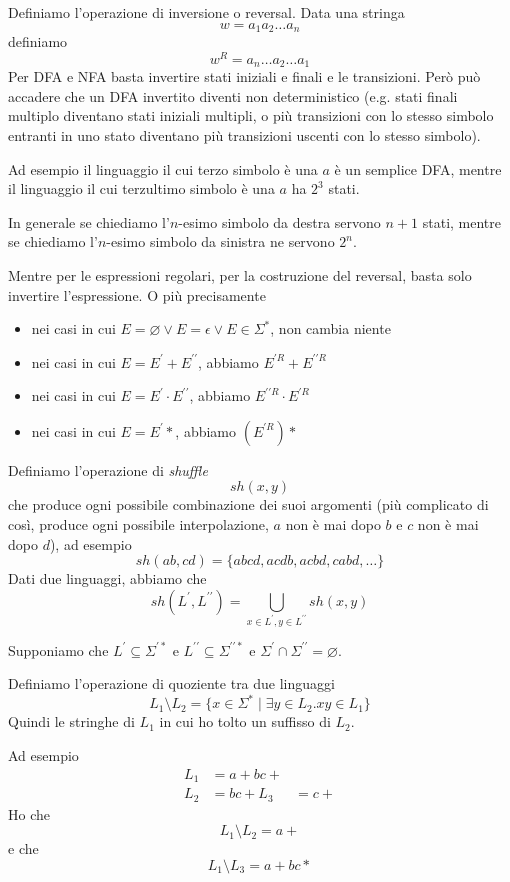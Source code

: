 \documentclass[12pt]{article}
\begin{document}
Definiamo l'operazione di inversione o reversal.
Data una stringa 
$$ w = a_1 a_2 \dots a_n $$
definiamo
$$ w^R = a_n \dots a_2 \dots a_1 $$
Per DFA e NFA basta invertire stati iniziali e finali e le transizioni.
Però può accadere che un DFA invertito diventi non deterministico (e.g. stati finali multiplo diventano stati iniziali multipli, o più transizioni con lo stesso simbolo entranti in uno stato diventano più transizioni uscenti con lo stesso simbolo).
\begin{tcolorbox}
	Ad esempio il linguaggio il cui terzo simbolo è una $a$ è un semplice DFA, mentre il linguaggio il cui terzultimo simbolo è una $a$ ha $2^3$ stati.

	In generale se chiediamo l'$n$-esimo simbolo da destra servono $n + 1$ stati, mentre se chiediamo l'$n$-esimo simbolo da sinistra ne servono $2^n$.
\end{tcolorbox}
Mentre per le espressioni regolari, per la costruzione del reversal, basta solo invertire l'espressione.
O più precisamente
\begin{itemize}
	\item nei casi in cui $E = \varnothing \vee E = \epsilon \vee E \in \Sigma^*$, non cambia niente
	\item nei casi in cui $E = E^\prime + E^{\prime\prime}$, abbiamo $E^{\prime R} + E^{\prime\prime R}$
	\item nei casi in cui $E = E^\prime \cdot E^{\prime\prime}$, abbiamo $E^{\prime\prime R} \cdot E^{\prime R}$
	\item nei casi in cui $E = E^{\prime}*$, abbiamo $(E^{\prime R})*$
\end{itemize}

Definiamo l'operazione di \textit{shuffle}
$$ sh(x, y) $$
che produce ogni possibile combinazione dei suoi argomenti (più complicato di così, produce ogni possibile interpolazione, $a$ non è mai dopo $b$ e $c$ non è mai dopo $d$), ad esempio
$$ sh(ab, cd) = \{ abcd, acdb, acbd, cabd, \dots  \} $$
Dati due linguaggi, abbiamo che
$$ sh(L^\prime, L^{\prime\prime}) = \bigcup_{x \in L^\prime, y \in L^{\prime\prime}} sh(x, y) $$

Supponiamo che $L^\prime \subseteq \Sigma^{\prime *}$ e $L^{\prime\prime} \subseteq \Sigma^{\prime\prime *}$ e $\Sigma^\prime \cap \Sigma^{\prime\prime} = \varnothing$.

Definiamo l'operazione di quoziente tra due linguaggi
$$ L_1 \setminus L_2 = \{ x \in \Sigma^* \mid \exists y \in L_2 . xy \in L_1 \} $$
Quindi le stringhe di $L_1$ in cui ho tolto un suffisso di $L_2$.
\begin{tcolorbox}
	Ad esempio
	\begin{align*}
		L_1 &= a+bc+ \\
		L_2 &= bc+ 
		L_3 &= c+
	\end{align*}
	Ho che
	$$ L_1 \setminus L_2 = a+ $$
	e che
	$$ L_1 \setminus L_3 = a+bc* $$
\end{tcolorbox}
\end{document}

